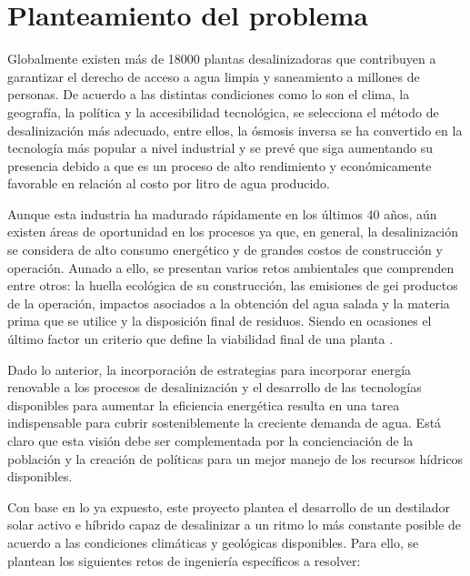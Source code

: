 \chapter{Planteamiento del problema}

	Globalmente existen más de \num{18000} plantas desalinizadoras que contribuyen a garantizar el derecho de acceso a agua limpia y saneamiento a millones de personas. De acuerdo a las distintas condiciones como lo son el clima, la geografía, la política y la accesibilidad tecnológica, se selecciona el método de desalinización más adecuado, entre ellos, la ósmosis inversa se ha convertido en la tecnología más popular a nivel industrial \cite[11]{lattemann_chapter_2010} y se prevé que siga aumentando su presencia \cite{intelligence_ro_2021} debido a que es un proceso de alto rendimiento y económicamente favorable en relación al costo por litro de agua producido.
	
	Aunque esta industria ha madurado rápidamente en los últimos 40 años, aún existen áreas de oportunidad en los procesos ya que, en general, la desalinización se considera de alto consumo energético y de grandes costos de construcción y operación. Aunado a ello, se presentan varios retos ambientales que comprenden entre otros: la huella ecológica de su construcción, las emisiones de \acrshort{gei} productos de la operación, impactos asociados a la obtención del agua salada y la materia prima que se utilice y la disposición final de residuos. Siendo en ocasiones el último factor un criterio que define la viabilidad final de una planta \cite{singh_experimental_2016}.
	
	Dado lo anterior, la incorporación de estrategias para incorporar energía renovable a los procesos de desalinización y el desarrollo de las tecnologías disponibles para aumentar la eficiencia energética resulta en una tarea indispensable para cubrir sosteniblemente la creciente demanda de agua. Está claro que esta visión debe ser complementada por la concienciación de la población y la creación de políticas para un mejor manejo de los recursos hídricos disponibles.
	
	Con base en lo ya expuesto, este proyecto plantea el desarrollo de un destilador solar activo e híbrido capaz de desalinizar a un ritmo lo más constante posible de acuerdo a las condiciones climáticas y geológicas disponibles. Para ello, se plantean los siguientes retos de ingeniería específicos a resolver:
	
